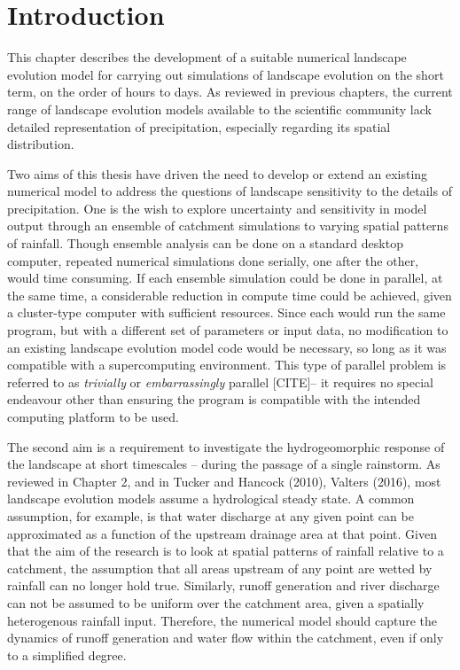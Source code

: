 \documentclass[12pt,oneside,PhD]{muthesis}
\begin{document}
\section{Introduction}
This chapter describes the development of a suitable numerical landscape evolution model for carrying out simulations of landscape evolution on the short term, on the order of hours to days. As reviewed in previous chapters, the current range of landscape evolution models available to the scientific community lack detailed representation of precipitation, especially regarding its spatial distribution. 

Two aims of this thesis have driven the need to develop or extend an existing numerical model to address the questions of landscape sensitivity to the details of precipitation. One is the wish to explore uncertainty and sensitivity in model output through an ensemble of catchment simulations to varying spatial patterns of rainfall. Though ensemble analysis can be done on a standard desktop computer, repeated numerical simulations done serially, one after the other, would time consuming. If each ensemble simulation could be done in parallel, at the same time, a considerable reduction in compute time could be achieved, given a cluster-type computer with sufficient resources. Since each would run the same program, but with a different set of parameters or input data, no modification to an existing landscape evolution model code would be necessary, so long as it was compatible with a supercomputing environment. This type of parallel problem is referred to as \textit{trivially} or \textit{embarrassingly} parallel [CITE]-- it requires no special endeavour other than ensuring the program is compatible with the intended computing platform to be used.

The second aim is a requirement to investigate the hydrogeomorphic response of the landscape at short timescales -- during the passage of a single rainstorm. As reviewed in Chapter 2, and in Tucker and Hancock (2010), Valters (2016), most landscape evolution models assume a hydrological steady state. A common assumption, for example, is that water discharge at any given point can be approximated as a function of the upstream drainage area at that point. Given that the aim of the research is to look at spatial patterns of rainfall relative to a catchment, the assumption that all areas upstream of any point are wetted by rainfall can no longer hold true. Similarly, runoff generation and river discharge can not be assumed to be uniform over the catchment area, given a spatially heterogenous rainfall input. Therefore, the numerical model should capture the dynamics of runoff generation and water flow within the catchment, even if only to a simplified degree. 
\end{document}
